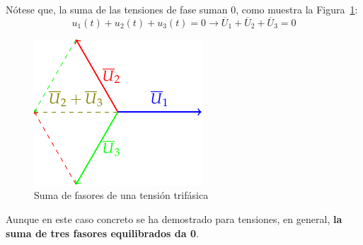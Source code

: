 	Nótese que, la suma de las tensiones de fase suman 0, como muestra la Figura~\ref{fig.fasoressumacero}:
	\begin{equation*}
		u_1(t) + u_2(t) + u_3(t) = 0\rightarrow \overline{U}_1 + \overline{U}_2 + \overline{U}_3 = 0
	\end{equation*}
	\begin{figure}
		\centering
		\includegraphics{../figs/FasoresSumaCero.pdf}
		\caption{Suma de fasores de una tensión trifásica}
		\label{fig.fasoressumacero}
	\end{figure}
	\begin{remark}
	    Aunque en este caso concreto se ha demostrado para tensiones, en general, \textbf{la suma de tres fasores equilibrados da 0}.
	\end{remark}
	
